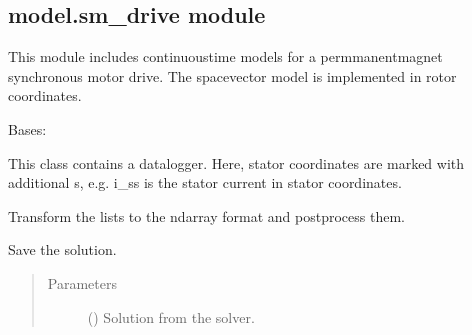 \documentclass[letterpaper,10pt,english]{sphinxmanual}
\begin{document}
\subsection{model.sm\_drive module}
\label{\detokenize{model:module-model.sm_drive}}\label{\detokenize{model:model-sm-drive-module}}
\sphinxAtStartPar
This module includes continuous\sphinxhyphen{}time models for a permmanent\sphinxhyphen{}magnet
synchronous motor drive. The space\sphinxhyphen{}vector model is implemented in rotor
coordinates.

\begin{fulllineitems}
\label{\detokenize{model:model.sm_drive.Datalogger}}
\pysigstartsignatures
{}
\pysigstopsignatures
\sphinxAtStartPar
Bases: 

\sphinxAtStartPar
This class contains a datalogger. Here, stator coordinates are marked
with additional s, e.g. i\_ss is the stator current in stator coordinates.

\begin{fulllineitems}
\label{\detokenize{model:model.sm_drive.Datalogger.post_process}}
\pysigstartsignatures
{}
\pysigstopsignatures
\sphinxAtStartPar
Transform the lists to the ndarray format and post\sphinxhyphen{}process them.

\end{fulllineitems}


\begin{fulllineitems}
\label{\detokenize{model:model.sm_drive.Datalogger.save}}
\pysigstartsignatures
{}
\pysigstopsignatures
\sphinxAtStartPar
Save the solution.
\begin{quote}\begin{description}
\item[{Parameters}] \leavevmode
\sphinxAtStartPar
{} () \textendash{} Solution from the solver.

\end{description}\end{quote}

\end{fulllineitems}


\end{fulllineitems}
\end{document}

